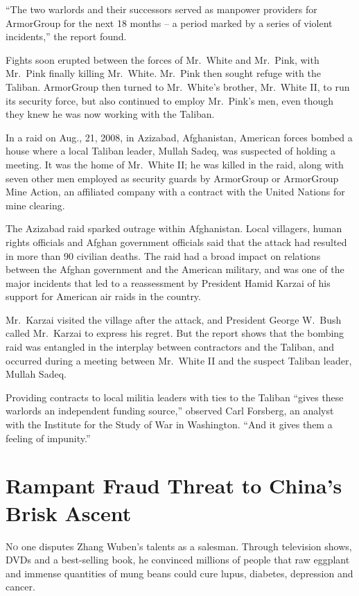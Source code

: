 ﻿\documentclass[12pt]{article}
\begin{document}
``The two warlords and their successors served as manpower providers for ArmorGroup for the next 18
months -- a period marked by a series of violent incidents,'' the report found.

Fights soon erupted between the forces of Mr.~White and Mr.~Pink, with Mr.~Pink finally killing
Mr.~White. Mr.~Pink then sought refuge with the Taliban. ArmorGroup then turned to Mr.~White's
brother, Mr.~White II, to run its security force, but also continued to employ Mr.~Pink's men, even
though they knew he was now working with the Taliban.

In a raid on Aug., 21, 2008, in Azizabad, Afghanistan, American forces bombed a house where a local
Taliban leader, Mullah Sadeq, was suspected of holding a meeting. It was the home of Mr.~White II;
he was killed in the raid, along with seven other men employed as security guards by ArmorGroup or
ArmorGroup Mine Action, an affiliated company with a contract with the United Nations for mine
clearing.

The Azizabad raid sparked outrage within Afghanistan. Local villagers, human rights officials and
Afghan government officials said that the attack had resulted in more than 90 civilian deaths. The
raid had a broad impact on relations between the Afghan government and the American military, and
was one of the major incidents that led to a reassessment by President Hamid Karzai of his support
for American air raids in the country.

Mr.~Karzai visited the village after the attack, and President George W.~Bush called Mr.~Karzai to
express his regret. But the report shows that the bombing raid was entangled in the interplay
between contractors and the Taliban, and occurred during a meeting between Mr.~White II and the
suspect Taliban leader, Mullah Sadeq.

Providing contracts to local militia leaders with ties to the Taliban ``gives these warlords an
independent funding source,'' observed Carl Forsberg, an analyst with the Institute for the Study of
War in Washington. ``And it gives them a feeling of impunity.''

\section{Rampant Fraud Threat to China's Brisk Ascent}

\lettrine{N}{o} one disputes Zhang Wuben's talents as a salesman. Through
television shows, DVDs and a best-selling book, he convinced millions of people that raw eggplant
and immense quantities of mung beans could cure lupus, diabetes, depression and cancer.
\end{document}
